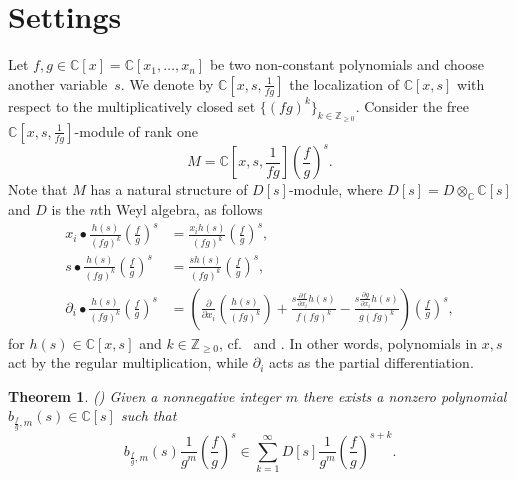 \documentclass[a4paper,12pt]{amsart}
\theoremstyle{plain}
\newtheorem{theorem}{Theorem}[section]
\theoremstyle{definition}
\theoremstyle{remark}
\def\CC{\mathbb{C}}
\def\ZZ{\mathbb{Z}}
\begin{document}
\section{Settings}\label{sec:settings}

Let $f,g \in \CC[x] = \CC[x_1,\ldots,x_n]$ be two non-constant polynomials and choose another variable~$s$.
We denote by $\CC[x,s,\frac{1}{fg}]$ the localization of $\CC[x,s]$ with respect to the
multiplicatively closed set $\{(fg)^k\}_{k\in \ZZ_{\geq 0}}$. Consider the free $\CC[x,s,\frac{1}{fg}]$-module
of rank one
\[
M = \CC\left[x,s,\frac{1}{fg}\right] \left( \frac{f}{g} \right)^s.
\]
Note that $M$ has a natural structure of $D[s]$-module, where $D[s] = D \otimes_\CC \CC[s]$ and $D$ is the $n$th Weyl algebra,
as follows
\[
\begin{aligned}
x_i \bullet \frac{h(s)}{(fg)^k} \left(\frac{f}{g}\right)^s &= \frac{x_i h(s)}{(fg)^k}  \left(\frac{f}{g}\right)^s, \\
s \bullet \frac{h(s)}{(fg)^k} \left(\frac{f}{g}\right)^s &= \frac{s h(s)}{(fg)^k} \left(\frac{f}{g}\right)^s, \\
\partial_i \bullet \frac{h(s)}{(fg)^k} \left(\frac{f}{g}\right)^s &=
\left(
\frac{\partial}{\partial x_i} \left( \frac{h(s)}{(fg)^k} \right)
+ \frac{s \frac{\partial f}{\partial x_i} h(s)}{f (fg)^k}
- \frac{s \frac{\partial g}{\partial x_i} h(s)}{g(fg)^k}
\right)
\left(\frac{f}{g}\right)^s,
\end{aligned}
\]
for $h(s) \in \CC[x,s]$ and $k \in \ZZ_{\geq 0}$, cf.~\cite[Equation 1.4-1.5]{Tak23} and \cite[Definition 3.6]{AGLN21}. In other words, polynomials in $x,s$ act by the regular multiplication, while $\partial_i$ acts as the partial differentiation.

\begin{theorem}\label{thm:Takeuchi} {\rm (\cite[Theorem 1.1]{Tak23})}
Given a nonnegative integer $m$ there exists a nonzero polynomial $b_{\frac{f}{g},m}^{}(s) \in \CC[s]$ such that 
\begin{equation*}%
b_{\frac{f}{g},m}^{}(s) \frac{1}{g^m} \left( \frac{f}{g} \right)^s \in
\sum_{k = 1}^\infty D[s] \frac{1}{g^m} \left( \frac{f}{g} \right)^{s+k}.
\end{equation*}
\end{theorem}
\end{document}
